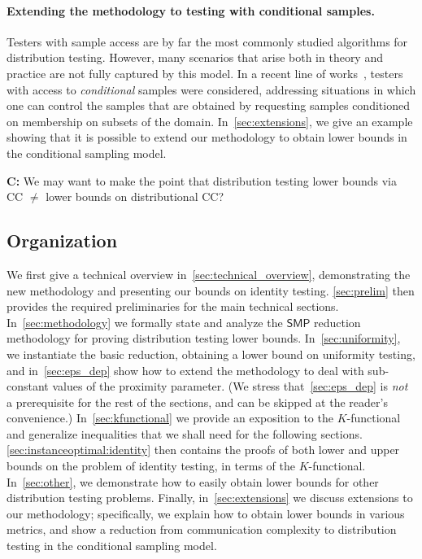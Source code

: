\documentclass[11pt]{article}
\theoremstyle{remark}   	\newtheorem{remark}[theorem]{Remark}
\theoremstyle{definition}   	\newaliascnt{defn}{theorem}
\newcommand{\ccolor}[1]{{#1}}
\newcommand{\ecolor}[1]{{#1}}
\newcommand{\tcolor}[1]{{#1}}
\newcommand{\cnote}[1]{\par\ccolor{\textbf{C: }\sf #1}}   \newcommand{\enote}[1]{\par\ecolor{\textbf{E: }\sf #1}}   \newcommand{\tnote}[1]{\par\tcolor{\textbf{T: }\sf #1}}   \newcommand{\todonote}[2][]{\todo[size=\scriptsize,color=red!40,#1]{#2}}
\newcommand{\questionnote}[2][]{\todo[size=\scriptsize,color=blue!30]{#2}}
\newcommand{\cnote}[1]{}
\newcommand{\enote}[1]{}
\newcommand{\tnote}[1]{}
\newcommand{\todonote}[2][]{\ignore{#2}}
\newcommand{\questionnote}[2][]{\ignore{#2}}
\newcommand{\ignore}[1]{\leavevmode\unskip} \newcommand{\cmargin}[1]{\questionnote{\ccolor{#1}}} \newcommand{\emargin}[1]{\questionnote{\ecolor{#1}}} \newcommand{\tmargin}[1]{\questionnote{\tcolor{#1}}}
\newcommand{\SMP}{\ensuremath{\mathsf{SMP}}}
\begin{document}
\paragraph{Extending the methodology to testing with conditional samples.} Testers with sample access are by far the most commonly studied algorithms for distribution testing. However, many scenarios that arise both in theory and practice are not  fully captured by this model. In a recent line of works~\cite{CFGM:13,CRS:12,ACK:14,FJOPS:15,FLV:16}, testers with access to \emph{conditional} samples were considered, addressing situations in which one can control the samples that are obtained by requesting samples conditioned on membership on subsets of the domain. In~\autoref{sec:extensions}, we give an example showing that it is possible to extend our methodology to obtain lower bounds in the conditional sampling model.

\cnote{We may want to make the point that distribution testing lower bounds via CC $\neq$ lower bounds on distributional CC?}

\subsection{Organization}
We first give a technical overview in~\autoref{sec:technical_overview}, demonstrating the new methodology and presenting our bounds on identity testing. \autoref{sec:prelim} then provides the required preliminaries for the main technical sections. In~\autoref{sec:methodology} we formally state and analyze the $\SMP$ reduction methodology for proving distribution testing lower bounds. In~\autoref{sec:uniformity}, we instantiate the basic reduction, obtaining a lower bound on uniformity testing, and in~\autoref{sec:eps_dep} show how to extend the methodology to deal with sub-constant values of the proximity parameter. (We stress that~\autoref{sec:eps_dep} is \emph{not} a prerequisite for the rest of the sections, and can be skipped at the reader's convenience.) In~\autoref{sec:kfunctional} we provide an exposition to the $K$-functional and generalize inequalities that we shall need for the following sections. \autoref{sec:instanceoptimal:identity} then contains the proofs of both lower and upper bounds on the problem of identity testing, in terms of the $K$-functional. In~\autoref{sec:other}, we demonstrate how to easily obtain lower bounds for other distribution testing problems. Finally, in~\autoref{sec:extensions} we discuss extensions to our methodology; specifically, we explain how to obtain lower bounds in various metrics, and show a reduction from communication complexity to distribution testing in the conditional sampling model.
\end{document}
